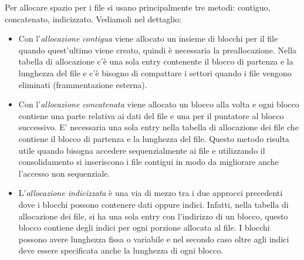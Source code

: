 Per allocare spazio per i file si usano principalmente tre metodi: contiguo, concatenato, indicizzato. Vediamoli nel dettaglio:
\begin{itemize}
    \item Con l'\textit{allocazione contigua} viene allocato un insieme di blocchi per il file quando quest'ultimo viene creato, quindi è necessaria la preallocazione. Nella tabella di allocazione c'è una sola entry contenente il blocco di partenza e la lunghezza del file e c'è bisogno di compattare i settori quando i file vengono eliminati (frammentazione esterna).
    
    \item Con l'\textit{allocazione concatenata} viene allocato un blocco alla volta e ogni blocco contiene una parte relativa ai dati del file e una per il puntatore al blocco successivo. E' necessaria una sola entry nella tabella di allocazione dei file che contiene il blocco di partenza e la lunghezza del file. Questo metodo risulta utile quando bisogna accedere sequenzialmente ai file e utilizzando il consolidamento si inseriscono i file contigui in modo da migliorare anche l'accesso non sequenziale.

    \item L'\textit{allocazione indicizzata} è una via di mezzo tra i due approcci precedenti dove i blocchi possono contenere dati oppure indici. Infatti, nella tabella di allocazione dei file, si ha una sola entry con l'indirizzo di un blocco, questo blocco contiene degli indici per ogni porzione allocata al file. I blocchi possono avere lunghezza fissa o variabile e nel secondo caso oltre agli indici deve essere specificata anche la lunghezza di ogni blocco.
\end{itemize}


